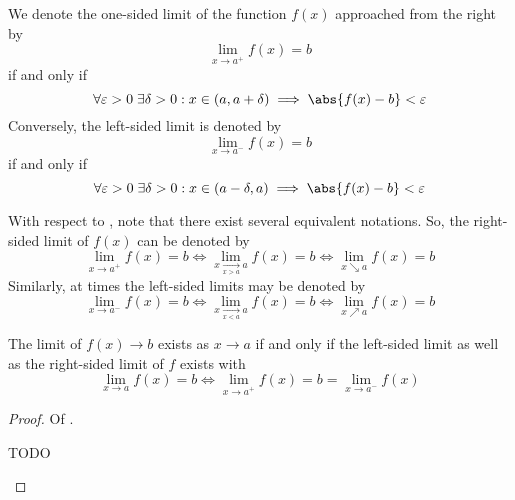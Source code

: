 \begin{definition}\label{def-one-sided-limits}
	We denote the one-sided limit of the function $f(x)$ approached from the right by
	\begin{equation*}
		\lim_{x \to a^+}f(x)=b
	\end{equation*}
	if and only if
	\begin{equation}
		\forall\varepsilon>0\;\exists\delta>0:x\in(a,a+\delta)\implies\abs{f(x)-b}<\varepsilon
	\end{equation}
	Conversely, the left-sided limit is denoted by
	\begin{equation*}
		\lim_{x \to a^-}f(x)=b
	\end{equation*}
	if and only if
	\begin{equation}
		\forall\varepsilon>0\;\exists\delta>0:x\in(a-\delta,a)\implies\abs{f(x)-b}<\varepsilon
	\end{equation}
\end{definition}

\begin{rem}\label{rem-one-sided-limits}
	With respect to , note that there exist
	several equivalent notations. So, the right-sided limit of $f(x)$ can be denoted
	by
	\begin{equation*}
		\lim_{x \to a^+}f(x)=b
		\iff
		\lim_{x \underset{x>a}{\to} a}f(x)=b
		\iff
		\lim_{x\searrow  a}f(x)=b
	\end{equation*}
	Similarly, at times the left-sided limits may be denoted by
	\begin{equation*}
		\lim_{x \to a^-}f(x)=b
		\iff
		\lim_{x \underset{x<a}{\to} a}f(x)=b
		\iff
		\lim_{x \nearrow a}f(x)=b
	\end{equation*}
\end{rem}

\begin{thm}\label{thm-limit-exists-one-sided-limits}
	The limit of $f(x) \to b$ exists as $x \to a$ if and only if the left-sided
	limit as well as the right-sided limit of $f$ exists with
	\begin{equation}
		\lim_{x \to a}f(x)=b \iff \lim_{x \to a^+}f(x)=b=\lim_{x \to a^-}f(x)
	\end{equation}
\end{thm}

\begin{proof}
	Of .
	\begin{flushleft}
		TODO
	\end{flushleft}
\end{proof}

